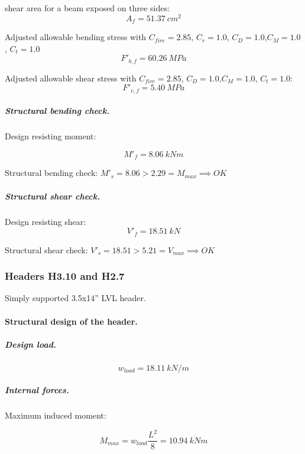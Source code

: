 \noindent shear area for a beam exposed on three sides:
\begin{equation}
  A_f= 51.37\ cm^2
\end{equation}

\noindent Adjusted allowable bending stress with $C_{fire}= 2.85$, $C_r= 1.0$, $C_D= 1.0$,$C_M= 1.0$, $C_t= 1.0$
\begin{equation}
  F'_{b,f}= 60.26\ MPa
\end{equation}

\noindent Adjusted allowable shear stress with  $C_{fire}= 2.85$, $C_D= 1.0$,$C_M= 1.0$, $C_t= 1.0$:
\begin{equation}
  F'_{v,f}= 5.40\ MPa
\end{equation}

\subparagraph{Structural bending check.}

\noindent Design resisting moment:

\begin{equation}
  M'_f= 8.06\ kN m
\end{equation}

\noindent Structural bending check: $M'_s = 8.06 > 2.29 = M_{max} \implies OK$

\subparagraph{Structural shear check.}

\noindent Design resisting shear:
\begin{equation}
  V'_f= 18.51\ kN
\end{equation}

\noindent Structural shear check: $V'_s = 18.51 > 5.21 = V_{max} \implies OK$

\subsubsection{Headers H3.10 and H2.7}
Simply supported 3.5x14'' LVL header.

\paragraph{Structural design of the header.}

\subparagraph{Design load.}

\begin{equation}
  w_{load}= 18.11\ kN/m
\end{equation}

\subparagraph{Internal forces.}

\noindent Maximum induced moment:

\begin{equation}
  M_{max}= w_{load} \frac{L^2}{8}= 10.94\ kN m
\end{equation}

